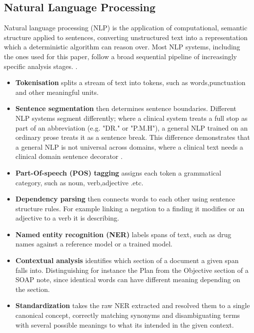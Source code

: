 \documentclass[11pt,a4paper]{article}
\begin{document}
 \subsection{Natural Language Processing}
 \label{sec:Natural Language Processing}
 Natural language processing (NLP) is the application of computational, semantic structure applied to sentences, converting unstructured text into a representation which a deterministic algorithm can reason over. Most NLP systems, including the ones used for this paper, follow a broad sequential pipeline of increasingly specific analysis stages. \cite{eyre2021launching} .

 \begin{itemize}
     \item \textbf{Tokenisation}  splits a stream of text into tokens, such as words,punctuation and other meaningful units.
     \item \textbf{Sentence segmentation} then determines sentence boundaries. Different NLP systems segment differently; where a clinical system treats a full stop as part of an abbreviation (e.g. "DR." or "P.M.H"),  a general NLP trained on an ordinary prose treats it as a sentence break. This difference demonstrates that a general NLP is not universal across domains, where a clinical text needs a clinical domain sentence decorator \cite{eyre2021launching} .
     \item \textbf{Part-Of-speech (POS) tagging} assigns each token a grammatical category, such as noun, verb,adjective .etc. 
     \item \textbf{Dependency parsing} then connects words to each other using sentence structure rules. For example linking a negation to a finding it modifies or an adjective to a verb it is describing.
     \item \textbf{Named entity recognition (NER)} labels spans of text, such as drug names against a reference model or a trained model.
     \item \textbf{Contextual analysis} identifies which section of a document a given span falls into. Distinguishing for instance the Plan from the Objective section of a SOAP note, since identical words can have different meaning depending on the section.
     \item \textbf{Standardization} takes the raw NER extracted and resolved them to a single canonical concept, correctly matching synonyms and disambiguating terms with several possible meanings to what its intended in the given context. 
 \end{itemize}  
\end{document}
